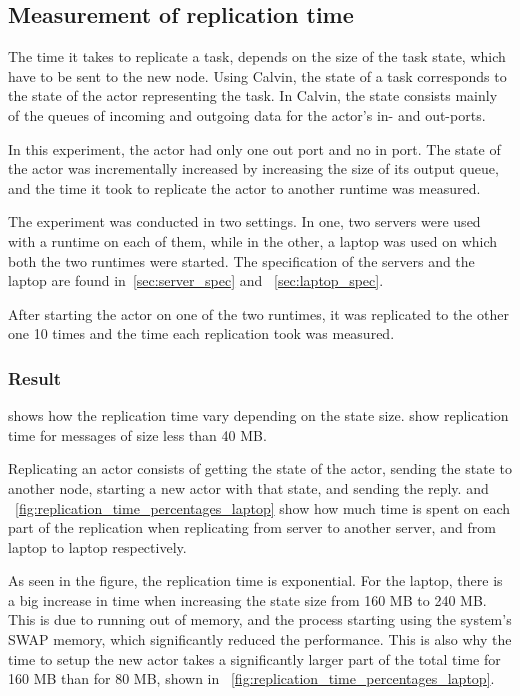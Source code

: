 \documentclass{cslthse-msc}
\begin{document}
\subsection{Measurement of replication time} \label{subsec:eval_repl_time}
The time it takes to replicate a task, depends on the size of the task state, which have to be sent to the new node. Using Calvin, the state of a task corresponds to the state of the actor representing the task. In Calvin, the state consists mainly of the queues of incoming and outgoing data for the actor's in- and out-ports.

In this experiment, the actor had only one out port and no in port. The state of the actor was incrementally increased by increasing the size of its output queue, and the time it took to replicate the actor to another runtime was measured.

The experiment was conducted in two settings. In one, two servers were used with a runtime on each of them, while in the other, a laptop was used on which both the two runtimes were started. The specification of the servers and the laptop are found in~\cref{sec:server_spec} and ~\cref{sec:laptop_spec}.

After starting the actor on one of the two runtimes, it was replicated to the other one 10 times and the time each replication took was measured. 

\subsubsection*{Result}
 shows how the replication time vary depending on the state size.  show replication time for messages of size less than 40 MB. 

Replicating an actor consists of getting the state of the actor, sending the state to another node, starting a new actor with that state, and sending the reply.  and ~\cref{fig:replication_time_percentages_laptop} show how much time is spent on each part of the replication when replicating from server to another server, and from laptop to laptop respectively.

As seen in the figure, the replication time is exponential. For the laptop, there is a big increase in time when increasing the state size from 160 MB to 240 MB. This is due to running out of memory, and the process starting using the system's SWAP memory, which significantly reduced the performance. This is also why the time to setup the new actor takes a significantly larger part of the total time for 160 MB than for 80 MB, shown in ~\cref{fig:replication_time_percentages_laptop}.
\end{document}
